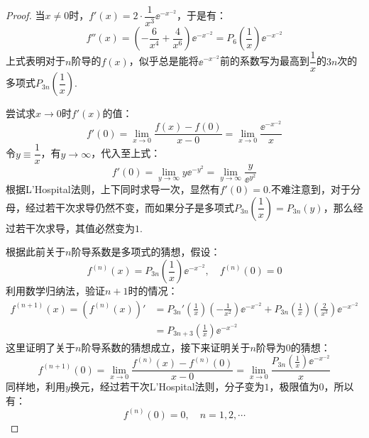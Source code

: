 \begin{proof}
    当$x \neq 0$时，$f'(x) = 2\cdot\dfrac{1}{x^3}\ee^{-x^{-2}}$，于是有：
    \[f''(x) = \left(-\frac{6}{x^4}+\frac{4}{x^6}\right) \ee^{-x^{-2}} = P_6\left(\frac{1}{x}\right) \ee^{-x^{-2}}\]
    上式表明对于$n$阶导的$f(x)$，似乎总是能将$\ee^{-x^{-2}}$前的系数写为最高到$\dfrac{1}{x}$的$3n$次的多项式$P_{3n}\left(\dfrac{1}{x}\right)$.

    尝试求$x\to 0$时$f'(x)$的值：
    \[f'(0) = \lim\limits_{x \to 0}\frac{f(x)-f(0)}{x-0} = \lim\limits_{x \to 0}\frac{\ee^{-x^{-2}}}{x}\]
    令$y \equiv \dfrac{1}{x}$，有$y \to \infty$，代入至上式：
    \[f'(0) = \lim\limits_{y \to \infty}y \ee^{-y^2} = \lim\limits_{y \to \infty}\frac{y}{\ee^{y^2}}\]
    根据L'Hospital法则，上下同时求导一次，显然有$f'(0)=0$.不难注意到，对于分母，经过若干次求导仍然不变，而如果分子是多项式$P_{3n}\left(\dfrac{1}{x}\right)=P_{3n}(y)$，那么经过若干次求导，其值必然变为$1$.

    根据此前关于$n$阶导系数是多项式的猜想，假设：
    \[f^{(n)}(x) = P_{3n}\left(\frac{1}{x}\right)\ee^{-x^{-2}},\quad f^{(n)}(0) = 0\]
    利用数学归纳法，验证$n+1$时的情况：
    \begin{align*}
        f^{(n+1)}(x) = \left(f^{(n)}(x)\right)' &= P_{3n}'\left(\frac{1}{x}\right)\left(-\frac{1}{x^2}\right)\ee^{-x^{-2}} + P_{3n}\left(\frac{1}{x}\right)\left(\frac{2}{x^3}\right)\ee^{-x^{-2}} \\
        &= P_{3n+3}\left(\frac{1}{x}\right)\ee^{-x^{-2}}
    \end{align*}
    这里证明了关于$n$阶导系数的猜想成立，接下来证明关于$n$阶导为$0$的猜想：
    \[f^{(n+1)}(0) = \lim\limits_{x \to 0}\frac{f^{(n)}(x) - f^{(n)}(0)}{x-0} = \lim\limits_{x \to 0}\frac{P_{3n}\left(\frac{1}{x}\right)\ee^{-x^{-2}}}{x}\]
    同样地，利用$y$换元，经过若干次L'Hospital法则，分子变为$1$，极限值为$0$，所以有：
    \[f^{(n)}(0) = 0,\quad n = 1,2,\cdots\]
\end{proof}